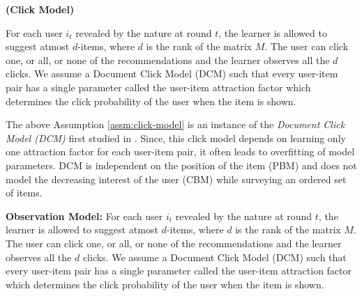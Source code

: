 \begin{assumption}\textbf{(Click Model)}
\label{assm:click-model}


For each user $i_t$ revealed by the nature at round $t$, the learner is allowed to suggest atmost $d$-items, where $d$ is the rank of the matrix $M$. The user can click one, or all, or none of the recommendations and the learner observes all the $d$ clicks. We assume a Document Click Model (DCM) such that every user-item pair has a single parameter called the user-item attraction factor which determines the click probability of the user when the item is shown.  

\end{assumption}

\begin{discussion}
The above Assumption \ref{assm:click-model} is an instance of the \textit{Document Click Model (DCM)} first studied in \citet{craswell2008experimental}. Since, this click model depends on learning only one attraction factor for each user-item pair, it often leads to overfitting of model parameters. DCM is independent on the position of the item (PBM) and does not model the decreasing interest of the user (CBM) while surveying an ordered set of  items. 
\end{discussion}


\textbf{Observation Model:} For each user $i_t$ revealed by the nature at round $t$, the learner is allowed to suggest atmost $d$-items, where $d$ is the rank of the matrix $M$. The user can click one, or all, or none of the recommendations and the learner observes all the $d$ clicks. We assume a Document Click Model (DCM) \citep{craswell2008experimental} such that every user-item pair has a single parameter called the user-item attraction factor which determines the click probability of the user when the item is shown.  

